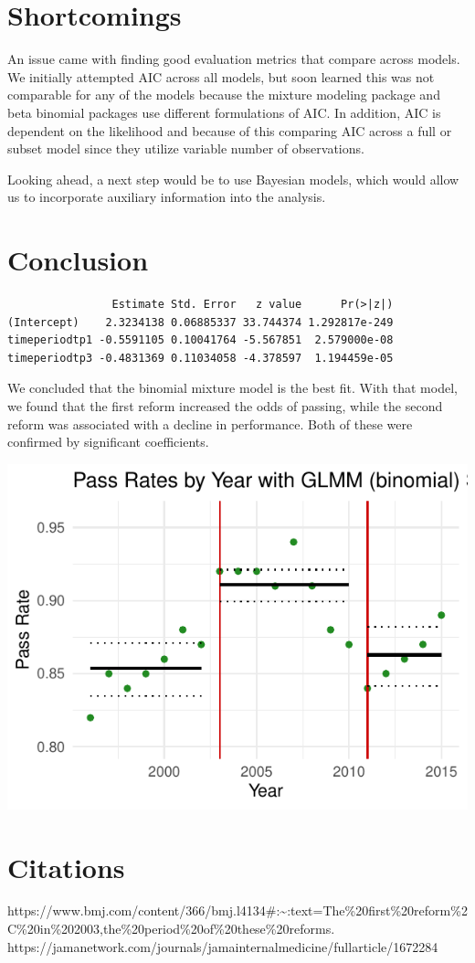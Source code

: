 \documentclass[
  letterpaper,
  DIV=11,
  numbers=noendperiod]{scrartcl}
\begin{document}
\section{Shortcomings}\label{shortcomings}

An issue came with finding good evaluation metrics that compare across
models. We initially attempted AIC across all models, but soon learned
this was not comparable for any of the models because the mixture
modeling package and beta binomial packages use different formulations
of AIC. In addition, AIC is dependent on the likelihood and because of
this comparing AIC across a full or subset model since they utilize
variable number of observations.

Looking ahead, a next step would be to use Bayesian models, which would
allow us to incorporate auxiliary information into the analysis.

\section{Conclusion}\label{conclusion}

\begin{verbatim}
                Estimate Std. Error   z value      Pr(>|z|)
(Intercept)    2.3234138 0.06885337 33.744374 1.292817e-249
timeperiodtp1 -0.5591105 0.10041764 -5.567851  2.579000e-08
timeperiodtp3 -0.4831369 0.11034058 -4.378597  1.194459e-05
\end{verbatim}

We concluded that the binomial mixture model is the best fit. With that
model, we found that the first reform increased the odds of passing,
while the second reform was associated with a decline in performance.
Both of these were confirmed by significant coefficients.

\includegraphics{Report_files/figure-pdf/unnamed-chunk-13-1.pdf}

\section{Citations}\label{citations}

https://www.bmj.com/content/366/bmj.l4134\#:\textasciitilde:text=The\%20first\%20reform\%2C\%20in\%202003,the\%20period\%20of\%20these\%20reforms.
https://jamanetwork.com/journals/jamainternalmedicine/fullarticle/1672284
\end{document}
